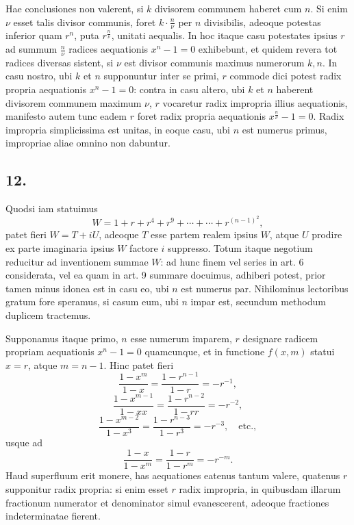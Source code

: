 \documentclass[12pt]{article}
\begin{document}
Hae conclusiones non valerent, si $k$ divisorem communem haberet cum $n$. Si enim $\nu$ esset talis divisor communis, foret $k\cdot\frac n\nu$ per $n$ divisibilis, adeoque potestas inferior quam $r^n$, puta $r^{\frac n\nu}$, unitati aequalis. In hoc itaque casu potestates ipsius $r$ ad summum $\frac n\nu$ radices aequationis $x^n-1=0$ exhibebunt, et quidem revera tot radices diversas sistent, si $\nu$ est divisor communis maximus numerorum $k,n$. In casu nostro, ubi $k$ et $n$ supponuntur inter se primi, $r$ commode dici potest radix propria aequationis $x^n-1=0$: contra in casu altero, ubi $k$ et $n$ haberent divisorem communem maximum $\nu$, $r$ vocaretur radix impropria illius aequationis, manifesto autem tunc eadem $r$ foret radix propria aequationis $x^{\frac n\nu}-1=0$. Radix impropria simplicissima est unitas, in eoque casu, ubi $n$ est numerus primus, impropriae aliae omnino non dabuntur.

\subsection*{12.}

Quodsi iam statuimus
\[
W=1+r+r^4+r^9+\cdots+\cdots+r^{(n-1)^2},
\]
patet fieri $W=T+iU$, adeoque $T$ esse partem realem ipsius $W$, atque $U$ prodire ex parte imaginaria ipsius $W$ factore $i$ suppresso. Totum itaque negotium reducitur ad inventionem summae $W$: ad hunc finem vel series in art. 6 considerata, vel ea quam in art. 9 summare docuimus, adhiberi potest, prior tamen minus idonea est in casu eo, ubi $n$ est numerus par. Nihilominus lectoribus gratum fore speramus, si casum eum, ubi $n$ impar est, secundum methodum duplicem tractemus.

Supponamus itaque primo, $n$ esse numerum imparem, $r$ designare radicem propriam aequationis $x^n-1=0$ quamcunque, et in functione $f(x,m)$ statui $x=r$, atque $m=n-1$. Hinc patet fieri
\[
\frac{1-x^m}{1-x}=\frac{1-r^{n-1}}{1-r}=-r^{-1},
\]
\[
\frac{1-x^{m-1}}{1-xx}=\frac{1-r^{n-2}}{1-rr}=-r^{-2},
\]
\[
\frac{1-x^{m-2}}{1-x^3}=\frac{1-r^{n-3}}{1-r^3}=-r^{-3},\quad\text{etc.},
\]
usque ad
\[
\frac{1-x}{1-x^m}=\frac{1-r}{1-r^m}=-r^{-m}.
\]
Haud superfluum erit monere, has aequationes eatenus tantum valere, quatenus $r$ supponitur radix propria: si enim esset $r$ radix impropria, in quibusdam illarum fractionum numerator et denominator simul evanescerent, adeoque fractiones indeterminatae fierent.
\end{document}
